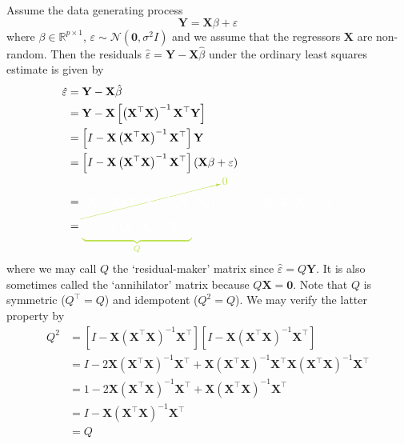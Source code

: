\documentclass[11pt]{report} %
\begin{document}
Assume the data generating process
\begin{equation}
\mathbf{Y} = \mathbf{X}\beta + \varepsilon
\end{equation}
where $\beta \in \mathbb{R}^{p\times 1}$, $\varepsilon \sim \mathcal{N}\left(\mathbf{0}, \sigma^{2}I\right)$ and we assume that the regressors $\mathbf{X}$ are non-random. Then the residuals $\hat{\varepsilon} = \mathbf{Y} - \mathbf{X}\hat{\beta}$ under the ordinary least squares estimate is given by
\begin{align}
\hat{\varepsilon} &= \mathbf{Y} - \mathbf{X}\hat{\beta} \\
&= \mathbf{Y} - \mathbf{X}\left[\left(\mathbf{X}^{\top}\mathbf{X}\right)^{-1}\mathbf{X}^{\top}\mathbf{Y}\right] \\
&= \left[I - \mathbf{X}\left(\mathbf{X}^{\top}\mathbf{X}\right)^{-1}\mathbf{X}^{\top}\right]\mathbf{Y} \\
&= \left[I - \mathbf{X}\left(\mathbf{X}^{\top}\mathbf{X}\right)^{-1}\mathbf{X}^{\top}\right]\left(\mathbf{X}\beta + \varepsilon\right) \\
&= \green\cancelto{\green 0}{\black \left[\mathbf{X} - \mathbf{X}\left(\mathbf{X}^{\top}\mathbf{X}\right)^{-1}\left(\mathbf{X}^{\top}\mathbf{X}\right)\right]}\black\beta + \left[I - \mathbf{X}\left(\mathbf{X}^{\top}\mathbf{X}\right)^{-1}\mathbf{X}^{\top}\right]\varepsilon \\
&= \green\underbrace{\black \left[I - \mathbf{X}\left(\mathbf{X}^{\top}\mathbf{X}\right)^{-1}\mathbf{X}^{\top}\right]}_{\green Q}\black \varepsilon
\end{align}
where we may call $Q$ the `residual-maker' matrix since $\hat{\varepsilon} = Q\mathbf{Y}$. It is also sometimes called the `annihilator' matrix because $Q\mathbf{X} = \mathbf{0}$. Note that $Q$ is symmetric ($Q^{\top} = Q$) and idempotent ($Q^{2} = Q$). We may verify the latter property by
\begin{align}
Q^{2} &= \left[I - \mathbf{X}\left(\mathbf{X}^{\top}\mathbf{X}\right)^{-1}\mathbf{X}^{\top}\right]\left[I - \mathbf{X}\left(\mathbf{X}^{\top}\mathbf{X}\right)^{-1}\mathbf{X}^{\top}\right] \\
&= I - 2\mathbf{X}\left(\mathbf{X}^{\top}\mathbf{X}\right)^{-1}\mathbf{X}^{\top} + \mathbf{X}\left(\mathbf{X}^{\top}\mathbf{X}\right)^{-1}\mathbf{X}^{\top}\mathbf{X}\left(\mathbf{X}^{\top}\mathbf{X}\right)^{-1}\mathbf{X}^{\top} \\
&= 1 - 2\mathbf{X}\left(\mathbf{X}^{\top}\mathbf{X}\right)^{-1}\mathbf{X}^{\top} + \mathbf{X}\left(\mathbf{X}^{\top}\mathbf{X}\right)^{-1}\mathbf{X}^{\top} \\
&= I - \mathbf{X}\left(\mathbf{X}^{\top}\mathbf{X}\right)^{-1}\mathbf{X}^{\top} \\
&= Q
\end{align}
\end{document}
